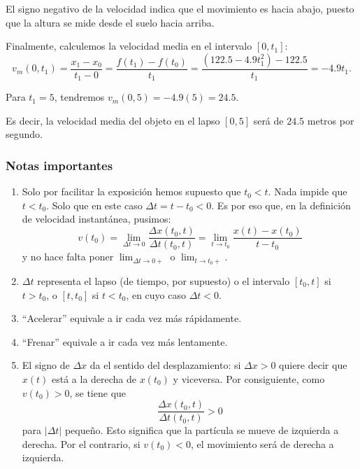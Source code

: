\begin{exemplo}[]{}
El signo negativo de la velocidad indica que el movimiento es hacia abajo, puesto que la altura se
mide desde el suelo hacia arriba.

Finalmente, calculemos la velocidad media en el intervalo $[0,t_1]$:
\begin{equation*}
	v_m(0, t_1)= \frac{x_1-x_0}{t_1-0}= \frac{f(t_1)-f(t_0)}{t_1}= \frac{(122.5-4.9t_1^2)-122.5}{t_1}=-4.9t_1.
\end{equation*}

Para $t_1=5$, tendremos $v_m(0, 5)=-4.9(5)=24.5$.

Es decir, la velocidad media del objeto en el lapso $[0,5]$ será de $24.5$ metros por segundo.
\end{exemplo}

\subsubsection{Notas importantes}

\begin{enumerate}[leftmargin=*]
\item Solo por facilitar la exposición hemos supuesto que $t_{0}<t$. Nada impide que $t<t_{0}$.
    Solo que en este caso $\Delta t = t - t_{0} < 0$. Es por eso que, en la definición de
    velocidad instantánea, pusimos:
\[
v(t_{0}) = \lim_{\Delta t \rightarrow 0}\frac{\Delta x(t_{0},t)}{\Delta t(t_{0},t)} =
      \lim_{t \rightarrow t_{0}}\frac{ x(t) - x(t_{0})}{t - t_{0}}
\]
y no hace falta poner $\lim_{\Delta t \rightarrow 0+}$ o $\lim_{ t \rightarrow t_{0}+}$.

\item $\Delta t$ representa el lapso (de tiempo, por supuesto) o el intervalo $[t_{0},t]$ si $t
    > t_{0}$, o $[t,t_{0}]$ si $t < t_{0}$, en cuyo caso $\Delta t < 0$.

\item ``Acelerar'' equivale a ir cada vez más rápidamente.

\item ``Frenar'' equivale a ir cada vez más lentamente.

\item El signo de $\Delta x$ da el sentido del desplazamiento: si $\Delta x > 0$ quiere decir
    que $x(t)$ está a la derecha de $x(t_{0})$ y viceversa. Por consiguiente, como $v(t_{0}) >
    0$, se tiene que
    \[
    \frac{\Delta x(t_{0},t)}{\Delta t(t_{0},t) }> 0
    \]
    para $|\Delta t|$ pequeño. Esto significa que la partícula se mueve de izquierda a derecha.
    Por el contrario, si $v(t_{0}) < 0$, el movimiento será de derecha a izquierda.
\end{enumerate}

